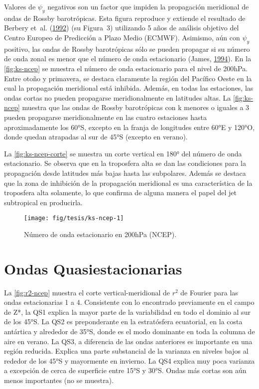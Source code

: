 \documentclass[spanish,a4paper,12pt]{book}
\begin{document}
Valores de \(\psi_y\) negativos son un factor que impiden la propagación
meridional de ondas de Rossby barotrópicas. Esta figura reproduce y
extiende el resultado de Berbery et~al.
(\protect\hyperlink{ref-Berbery1992}{1992}) (su Figura~3) utilizando 5
años de análisis objetivo del Centro Europeo de Predicción a Plazo Medio
(ECMWF). Asimismo, aún con \(\psi_y\) positivo, las ondas de Rossby
barotrópicas sólo se pueden propagar si su número de onda zonal es menor
que el número de onda estacionario (James,
\protect\hyperlink{ref-James}{1994}). En la \autoref{fig:ks-ncep} se
muestra el número de onda estacionario para el nivel de 200hPa. Entre
otoño y primavera, se destaca claramente la región del Pacífico Oeste en
la cual la propagación meridional está inhibida. Además, en todas las
estaciones, las ondas cortas no pueden propagarse meridionalmente en
latitudes altas. La \autoref{fig:ks-ncep} muestra que las ondas de
Rossby barotrópicas con k menores o iguales a 3 pueden propagarse
meridionalmente en las cuatro estaciones hasta aproximadamente los 60°S,
excepto en la franja de longitudes entre 60°E y 120°O, donde quedan
atrapadas al sur de 45°S (excepto en verano).

La \autoref{fig:ks-ncep-corte} se muestra un corte vertical en 180° del
número de onda estacionario. Se observa que en la troposfera alta se dan
las condiciones para la propagación desde latitudes más bajas hasta las
subpolares. Además se destaca que la zona de inhibición de la
propagación meridional es una característica de la troposfera alta
solamente, lo que confirma de alguna manera el papel del jet subtropical
en producirla.

\begin{landscape}\begin{figure}

{\centering \texttt{[image: fig/tesis/ks-ncep-1]} 

}

\caption{Número de onda estacionario en 200hPa (NCEP).}\label{fig:ks-ncep}
\end{figure}
\end{landscape}

\section{Ondas Quasiestacionarias}\label{ondas-quasiestacionarias}

La \autoref{fig:r2-ncep} muestra el corte vertical-meridional de \(r^2\)
de Fourier para las ondas estacionarias 1 a 4. Consistente con lo
encontrado previamente en el campo de Z*, la QS1 explica la mayor parte
de la variabilidad en todo el dominio al sur de los 45°S. La QS2 es
preponderante en la estratósfera ecuatorial, en la costa antártica y
alrededor de 35°S, donde es el modo dominante en toda la columna de aire
en verano. La QS3, a diferencia de las ondas anteriores es importante en
una región reducida. Explica una parte substancial de la varianza en
niveles bajos al rededor de los 45°S y mayormente en invierno. La QS4
explica muy poca varianza a excepción de cerca de superficie entre 15°S
y 30°S. Ondas más cortas son aún menos importantes (no se muestra).
\end{document}
